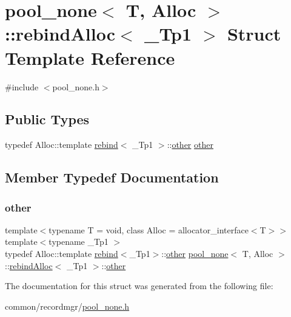 \hypertarget{structpool__none_1_1rebindAlloc}{}\section{pool\+\_\+none$<$ T, Alloc $>$\+:\+:rebind\+Alloc$<$ \+\_\+\+Tp1 $>$ Struct Template Reference}
\label{structpool__none_1_1rebindAlloc}


{\ttfamily \#include $<$pool\+\_\+none.\+h$>$}

\subsection*{Public Types}
\begin{DoxyCompactItemize}
\item 
typedef Alloc\+::template \hyperlink{structpool__none_1_1rebind}{rebind}$<$ \+\_\+\+Tp1 $>$\+::\hyperlink{structpool__none_1_1rebindAlloc_a26cf7cff0b8e2615f95ab74424a6c3df}{other} \hyperlink{structpool__none_1_1rebindAlloc_a26cf7cff0b8e2615f95ab74424a6c3df}{other}
\end{DoxyCompactItemize}


\subsection{Member Typedef Documentation}
\mbox{\label{structpool__none_1_1rebindAlloc_a26cf7cff0b8e2615f95ab74424a6c3df}} 
\subsubsection{\texorpdfstring{other}{other}}
{\footnotesize\ttfamily template$<$typename T  = void, class Alloc  = allocator\+\_\+interface$<$\+T$>$$>$ \\
template$<$typename \+\_\+\+Tp1 $>$ \\
typedef Alloc\+::template \hyperlink{structpool__none_1_1rebind}{rebind}$<$\+\_\+\+Tp1$>$\+::\hyperlink{structpool__none_1_1rebindAlloc_a26cf7cff0b8e2615f95ab74424a6c3df}{other} \hyperlink{classpool__none}{pool\+\_\+none}$<$ T, Alloc $>$\+::\hyperlink{structpool__none_1_1rebindAlloc}{rebind\+Alloc}$<$ \+\_\+\+Tp1 $>$\+::\hyperlink{structpool__none_1_1rebindAlloc_a26cf7cff0b8e2615f95ab74424a6c3df}{other}}



The documentation for this struct was generated from the following file\+:\begin{DoxyCompactItemize}
\item 
common/recordmgr/\hyperlink{pool__none_8h}{pool\+\_\+none.\+h}\end{DoxyCompactItemize}
